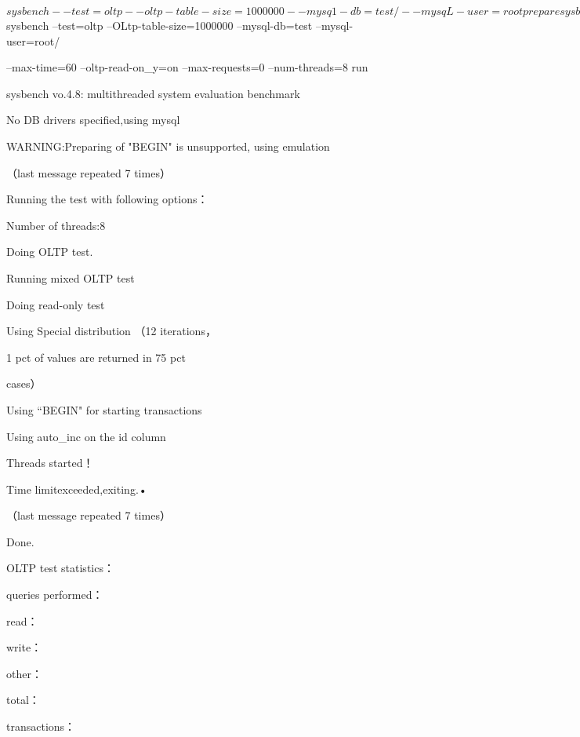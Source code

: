 $ sysbench

--test=oltp --oltp-table-size=1000000 --mysq1-db=test/

--mysqL-user=root prepare

sysbench vo.4.8: multithreaded system evaluation benchmark

No DB drivers specified, using mysql

Creating table 'sbtest'

Creating 1000000 records in table 'sbtest'...

生成测试数据只需要上面这条简单的命令即可。接下来可以运行测试，这个例子采
8个并发线程，只读模式，测试时长60秒：

$ sysbench --test=oltp --OLtp-table-size=1000000 --mysql-db=test --mysql-user=root/

--max-time=60 --oltp-read-on\_y=on --max-requests=0 --num-threads=8 run

sysbench vo.4.8: multithreaded system evaluation benchmark

No DB drivers specified,using mysql

WARNING:Preparing of "BEGIN" is unsupported, using emulation

（last message repeated 7 times）

Running the test with following options：

Number of threads:8

Doing OLTP test.

Running mixed OLTP test

Doing read-only test

Using Special distribution （12 iterations，

1 pct of values are returned in 75 pct

cases）

Using “BEGIN" for starting transactions

Using auto\_inc on the id column

Threads started！

Time limitexceeded,exiting.•

（last message repeated 7 times）

Done.

OLTP test statistics：

queries performed：

read：

write：

other：

total：

transactions：

